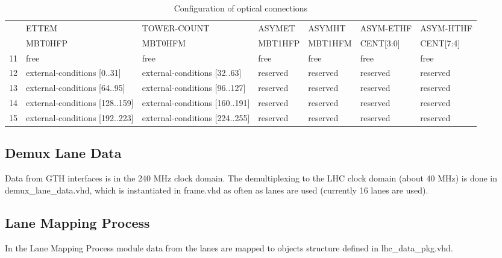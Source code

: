 \begin{table}[htdp]
\begin{center}
\begin{tabular}{c|m{}|m{}|m{}|m{}|m{}|m{}|}
\multicolumn{1}{|c|}{} &
\multicolumn{1}{l|}{ETTEM} & TOWER-COUNT & ASYMET & ASYMHT & ASYM-ETHF & ASYM-HTHF \\
\multicolumn{1}{|c|}{} &
\multicolumn{1}{l|}{MBT0HFP} & MBT0HFM & MBT1HFP & MBT1HFM & CENT[3:0] & CENT[7:4] \\\hline
\multicolumn{1}{|c|}{11} & free & free & free & free & free & free \\\hline
\multicolumn{1}{|c|}{12} & external-conditions [0..31] & external-conditions [32..63] & reserved & reserved & reserved & reserved \\\hline
\multicolumn{1}{|c|}{13} & external-conditions [64..95] & external-conditions [96..127] & reserved & reserved & reserved & reserved \\\hline
\multicolumn{1}{|c|}{14} & external-conditions [128..159] & external-conditions [160..191] & reserved & reserved & reserved & reserved \\\hline
\multicolumn{1}{|c|}{15} & external-conditions [192..223] & external-conditions [224..255] & reserved & reserved & reserved & reserved \\\hline
\end{tabular}
\end{center}
\caption{Configuration of optical connections}
\label{tab:framework:tab_configuration_optical_conn}
\end{table}

%
%

\subsection{Demux Lane Data} \label{sec:demux_lane_data}
Data from GTH interfaces is in the 240 MHz clock domain. The demultiplexing to the LHC clock domain (about 40 MHz) is done in demux\_lane\_data.vhd, which is instantiated
in frame.vhd as often as lanes are used (currently 16 lanes are used).

%
%

\subsection{Lane Mapping Process} \label{sec:lmp}
In the Lane Mapping Process module data from the lanes are mapped to objects structure defined in lhc\_data\_pkg.vhd.

